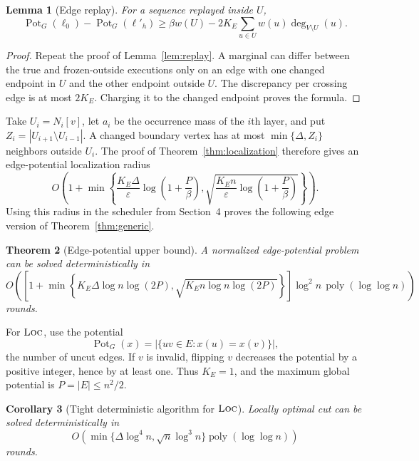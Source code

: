 \documentclass[11pt]{article}
\newtheorem{theorem}{Theorem}[section]
\newtheorem{lemma}[theorem]{Lemma}
\newtheorem{corollary}[theorem]{Corollary}
\theoremstyle{definition}
\theoremstyle{remark}
\newcommand{\Pot}{\operatorname{Pot}}
\newcommand{\poly}{\operatorname{poly}}
\newcommand{\eps}{\varepsilon}
\newcommand{\N}{N}
\newcommand{\LOC}{\textnormal{\textsc{Loc}}}
\begin{document}
\begin{lemma}[Edge replay]\label{lem:edge-replay}
For a sequence replayed inside $U$,
\[
 \Pot_G(\ell_0)-\Pot_G(\ell'_h)
 \geq \beta w(U)-2K_E\sum_{u\in U}w(u)\deg_{V\setminus U}(u).
\]
\end{lemma}

\begin{proof}
Repeat the proof of Lemma~\ref{lem:replay}.  A marginal can differ between the true
and frozen-outside executions only on an edge with one changed endpoint in $U$ and
the other endpoint outside $U$.  The discrepancy per crossing edge is at most
$2K_E$.  Charging it to the changed endpoint proves the formula.
\end{proof}

Take $U_i=\N_i[v]$, let $a_i$ be the occurrence mass of the $i$th layer, and put
$Z_i=|U_{i+1}\setminus U_{i-1}|$.  A changed boundary vertex has at most
$\min\{\Delta,Z_i\}$ neighbors outside $U_i$.  The proof of
Theorem~\ref{thm:localization} therefore gives an edge-potential localization radius
\begin{equation}\label{eq:edge-localization}
 O\!\left(1+\min\left\{
 \frac{K_E\Delta}{\eps}\log\!\left(1+\frac{P}{\beta}\right),
 \sqrt{\frac{K_E n}{\eps}\log\!\left(1+\frac{P}{\beta}\right)}
 \right\}\right).
\end{equation}
Using this radius in the scheduler from Section~4 proves the following edge version
of Theorem~\ref{thm:generic}.

\begin{theorem}[Edge-potential upper bound]\label{thm:edge-upper}
A normalized edge-potential problem can be solved deterministically in
\[
 O\!\left(
 \left[1+\min\left\{
 K_E\Delta\log n\log(2P),
 \sqrt{K_E n\log n\log(2P)}
 \right\}\right]
 \log^2 n\,\poly(\log\log n)
 \right)
\]
rounds.
\end{theorem}

For $\LOC$, use the potential
\[
 \Pot_G(x)=|\{uv\in E:x(u)=x(v)\}|,
\]
the number of uncut edges.  If $v$ is invalid, flipping $v$ decreases the potential
by a positive integer, hence by at least one.  Thus $K_E=1$, and the maximum global
potential is $P=|E|\leq n^2/2$.

\begin{corollary}[Tight deterministic algorithm for $\LOC$]\label{cor:loc}
Locally optimal cut can be solved deterministically in
\[
 O\!\left(
 \min\{\Delta\log^4 n,\sqrt n\log^3 n\}
 \poly(\log\log n)
 \right)
\]
rounds.
\end{corollary}
\end{document}
